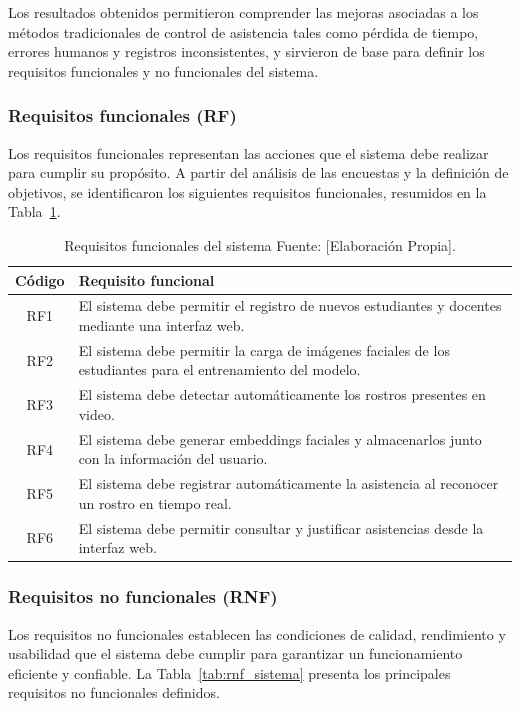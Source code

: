 Los resultados obtenidos permitieron comprender las mejoras asociadas a los métodos tradicionales de control de asistencia tales como pérdida de tiempo, errores humanos y registros inconsistentes, y sirvieron de base para definir los requisitos funcionales y no funcionales del sistema.

\subsubsection*{Requisitos funcionales (RF)}

Los requisitos funcionales representan las acciones que el sistema debe realizar para cumplir su propósito. A partir del análisis de las encuestas y la definición de objetivos, se identificaron los siguientes requisitos funcionales, resumidos en la Tabla~\ref{tab:rf_sistema}.


\begin{table}[H]
\centering
\caption{Requisitos funcionales del sistema Fuente: [Elaboración Propia].}
\label{tab:rf_sistema}
\begin{tabular}{|c|p{11cm}|}
\hline
\textbf{Código} & \textbf{Requisito funcional} \\ \hline
RF1 & El sistema debe permitir el registro de nuevos estudiantes y docentes mediante una interfaz web. \\ \hline
RF2 & El sistema debe permitir la carga de imágenes faciales de los estudiantes para el entrenamiento del modelo. \\ \hline
RF3 & El sistema debe detectar automáticamente los rostros presentes en video. \\ \hline
RF4 & El sistema debe generar embeddings faciales y almacenarlos junto con la información del usuario. \\ \hline
RF5 & El sistema debe registrar automáticamente la asistencia al reconocer un rostro en tiempo real. \\ \hline
RF6 & El sistema debe permitir consultar y justificar asistencias desde la interfaz web. \\ \hline
\end{tabular}
\end{table}



\subsubsection*{Requisitos no funcionales (RNF)}
\sloppy
Los requisitos no funcionales establecen las condiciones de calidad, rendimiento y usabilidad que el sistema debe cumplir para garantizar un funcionamiento eficiente y confiable. La Tabla~\ref{tab:rnf_sistema} presenta los principales requisitos no funcionales definidos.


